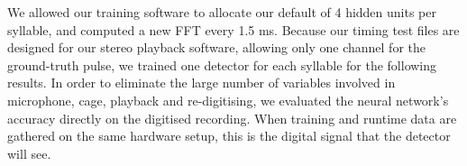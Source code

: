 \documentclass[10pt,letterpaper]{article}
\let\oldmarginpar\marginpar
\renewcommand{\marginpar}[1]{\oldmarginpar{\linespread{1}\scriptsize{#1}}}
\begin{document}
We allowed our training software to allocate our default of 4 hidden
units per syllable, and computed a new FFT every 1.5 ms.  Because our
timing test files are designed for our stereo playback software,
allowing only one channel for the ground-truth pulse, we trained one
detector for each syllable for the following results.  In order to
eliminate the large number of variables involved in microphone, cage,
playback and re-digitising, we evaluated the neural network's accuracy
directly on the digitised recording.  When training and runtime data
are gathered on the same hardware setup, this is the digital signal
that the detector will see.
\end{document}
